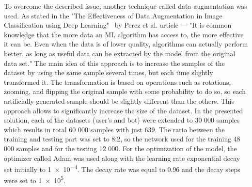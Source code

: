 To overcome the described issue, another technique called data augmentation was used.
As stated in the "The Effectiveness of Data Augmentation in Image Classification using Deep Learning"~\cite{augmentation} by Perez et al. article --- "It is common knowledge that the more data an ML algorithm has access to, the more effective it can be.
Even when the data is of lower quality, algorithms can actually perform better, as long as useful data can be extracted by the model from the original data set."
The main idea of this approach is to increase the samples of the dataset by using the same sample several times, but each time slightly transformed it.
The transformation is based on operations such as rotations, zooming, and flipping the original sample with some probability to do so, so each artificially generated sample should be slightly different than the others.
This approach allows to significantly increase the size of the dataset.
In the presented solution, each of the datasets (user's and bot) were extended to 30 000 samples which results in total 60 000 samples with just 639.
The ratio between the training and testing part was set to 8:2, so the network used for the training 48 000 samples and for the testing 12 000.
For the optimization of the model, the optimizer called Adam was used along with the learning rate exponential decay set initially to \num{1e-4}.
The decay rate was equal to \num{0.96} and the decay steps were set to \num{1e5}.